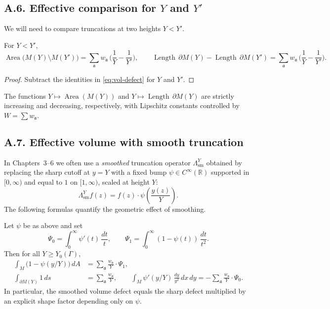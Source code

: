 \subsection*{A.6. Effective comparison for $Y$ and $Y'$}

\noindent
We will need to compare truncations at two heights $Y<Y'$.

\begin{lemma}\label{lem:Y-compare}
For $Y<Y'$,
\[
\operatorname{Area}\big(M(Y)\setminus M(Y')\big)= \sum_{\mathfrak a} w_{\mathfrak a}\,\Big(\frac{1}{Y}-\frac{1}{Y'}\Big),
\qquad
\operatorname{Length}\,\partial M(Y) - \operatorname{Length}\,\partial M(Y')= \sum_{\mathfrak a} w_{\mathfrak a}\,\Big(\frac{1}{Y}-\frac{1}{Y'}\Big).
\]
\end{lemma}

\begin{proof}
Subtract the identities in \eqref{eq:vol-defect} for $Y$ and $Y'$.
\end{proof}

\begin{corollary}\label{cor:monotone}
The functions $Y\mapsto \operatorname{Area}(M(Y))$ and
$Y\mapsto \operatorname{Length}\,\partial M(Y)$ are strictly increasing and
decreasing, respectively, with Lipschitz constants controlled by $W=\sum w_{\mathfrak a}$.
\end{corollary}

\subsection*{A.7. Effective volume with smooth truncation}

\noindent
In Chapters~3–6 we often use a \emph{smoothed} truncation operator $\Lambda^Y_{\mathrm{sm}}$
obtained by replacing the sharp cutoff at $y=Y$ with a fixed bump
$\psi\in C^\infty(\mathbb R)$ supported in $[0,\infty)$ and equal to $1$ on
$[1,\infty)$, scaled at height $Y$:
\[
\Lambda^Y_{\mathrm{sm}} f(z)= f(z)\cdot \psi\!\left(\frac{y(z)}{Y}\right).
\]
The following formulas quantify the geometric effect of smoothing.

\begin{lemma}\label{lem:smooth-vol}
Let $\psi$ be as above and set
\[
\Psi_0=\int_0^\infty \psi'(t)\,\frac{dt}{t},\qquad
\Psi_1=\int_0^\infty (1-\psi(t))\,\frac{dt}{t^2}.
\]
Then for all $Y\ge Y_0(\Gamma)$,
\begin{align*}
\int_{M}\big(1-\psi(y/Y)\big)\,dA
&=\sum_{\mathfrak a}\frac{w_{\mathfrak a}}{Y}\cdot \Psi_1,\\
\int_{\partial M(Y)} 1\,ds
&=\sum_{\mathfrak a}\frac{w_{\mathfrak a}}{Y},\qquad
\int_{M}\psi'(y/Y)\,\frac{dy}{y^2}\,dx\,dy
= -\sum_{\mathfrak a}\frac{w_{\mathfrak a}}{Y}\cdot \Psi_0.
\end{align*}
In particular, the smoothed volume defect equals the sharp defect multiplied by
an explicit shape factor depending only on $\psi$.
\end{lemma}

